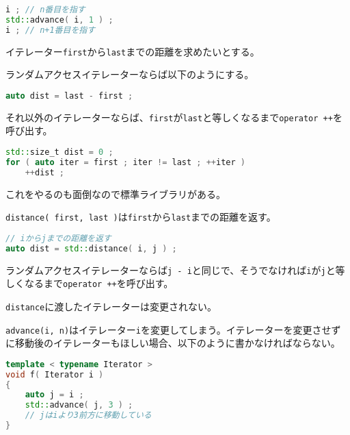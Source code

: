 \begin{lstlisting}[language={C++}]
i ; // n番目を指す
std::advance( i, 1 ) ;
i ; // n+1番目を指す
\end{lstlisting}


イテレーター\texttt{first}から\texttt{last}までの距離を求めたいとする。

ランダムアクセスイテレーターならば以下のようにする。

\begin{lstlisting}[language={C++}]
auto dist = last - first ;
\end{lstlisting}

それ以外のイテレーターならば、\texttt{first}が\texttt{last}と等しくなるまで\texttt{operator ++}を呼び出す。

\begin{lstlisting}[language={C++}]
std::size_t dist = 0 ;
for ( auto iter = first ; iter != last ; ++iter )
    ++dist ;
\end{lstlisting}

これをやるのも面倒なので標準ライブラリがある。

\texttt{distance( first, last )}は\texttt{first}から\texttt{last}までの距離を返す。

\begin{lstlisting}[language={C++}]
// iからjまでの距離を返す
auto dist = std::distance( i, j ) ;
\end{lstlisting}

ランダムアクセスイテレーターならば\texttt{j - i}と同じで、そうでなければ\texttt{i}が\texttt{j}と等しくなるまで\texttt{operator ++}を呼び出す。

\texttt{distance}に渡したイテレーターは変更されない。


\texttt{advance(i, n)}はイテレーター\texttt{i}を変更してしまう。イテレーターを変更させずに移動後のイテレーターもほしい場合、以下のように書かなければならない。

\begin{lstlisting}[language={C++}]
template < typename Iterator >
void f( Iterator i )
{
    auto j = i ;
    std::advance( j, 3 ) ;
    // jはiより3前方に移動している
}
\end{lstlisting}

